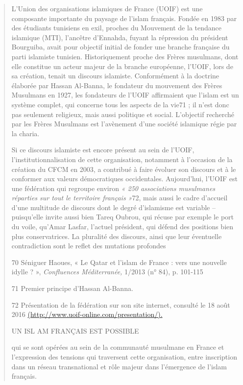 \begin{quote}
L'Union des organisations islamiques de France (UOIF) est une composante
importante du paysage de l'islam français. Fondée en 1983 par des
étudiants tunisiens en exil, proches du Mouvement de la tendance
islamique (MTI), l'ancêtre d'Ennahda, fuyant la répression du président
Bourguiba, avait pour objectif initial de fonder une branche française
du parti islamiste tunisien. Historiquement proche des Frères musulmans,
dont elle constitue un acteur majeur de la branche européenne, l'UOIF,
lors de sa création, tenait un discours islamiste. Conformément à la
doctrine élaborée par Hassan Al-Banna, le fondateur du mouvement des
Frères Musulmans en 1927, les fondateurs de l'UOIF affirmaient que
l'islam est un système complet, qui concerne tous les aspects de la
vie71 ; il n'est donc pas seulement religieux, mais aussi politique et
social. L'objectif recherché par les Frères Musulmans est l'avènement
d'une société islamique régie par la charia.

Si ce discours islamiste est encore présent au sein de l'UOIF,
l'institutionnalisation de cette organisation, notamment à l'occasion de
la création du CFCM en 2003, a contribué à faire évoluer son discours et
à le conformer aux valeurs démocratiques occidentales. Aujourd'hui,
l'UOIF est une fédération qui regroupe environ \emph{« 250 associations
musulmanes réparties sur tout le territoire français »}72, mais aussi le
cadre d'accueil d'une multitude de discours dont le degré d'islamisme
est variable -- puisqu'elle invite aussi bien Tareq Oubrou, qui récuse
par exemple le port du voile, qu'Amar Lasfar, l'actuel président, qui
défend des positions bien plus conservatrices. La pluralité des
discours, ainsi que leur éventuelle contradiction sont le reflet des
mutations profondes

70 Séniguer Haoues, « Le Qatar et l'islam de France : vers une nouvelle
idylle ? », \emph{Confluences Méditerranée,} 1/2013 (n° 84), p. 101-115

71 Premier principe d'Hassan Al-Banna.

72 Présentation de la fédération sur son site internet, consulté le 18
août 2016
\href{http://www.uoif-online.com/presentation/)}{(http://www.uoif-online.com/presentation/).}

UN ISL AM FRANÇAIS EST POSSIBLE

qui se sont opérées au sein de la communauté musulmane en France et
l'expression des tensions qui traversent cette organisation, entre
inscription dans un réseau transnational et rôle majeur dans l'émergence
de l'islam français.


\end{quote}
